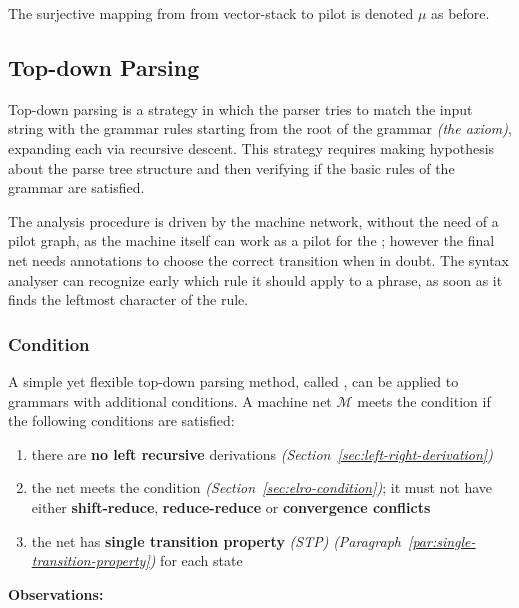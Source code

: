 \documentclass[english]{article}
\begin{document}
\bigskip
The surjective mapping from from vector-stack \mstates to pilot \mstates is denoted \(\mu\) as before.

\subsection{Top-down Parsing}
\label{sec:top-down}

Top-down parsing is a strategy in which the parser tries to match the input string with the grammar rules starting from the root of the grammar \textit{(the axiom)}, expanding each \RP via recursive descent.
This strategy requires making hypothesis about the parse tree structure and then verifying if the basic rules of the grammar are satisfied.

\bigskip
The analysis procedure is driven by the machine network, without the need of a pilot graph, as the machine itself can work as a pilot for the \PDA;
however the final net needs annotations to choose the correct transition when in doubt.
The syntax analyser can recognize early which rule it should apply to a phrase, as soon as it finds the leftmost character of the rule.

\subsubsection[ELL(1) Condition]{\ello Condition}

A simple yet flexible top-down parsing method, called \ello, can be applied to \elro grammars with additional conditions.
A machine net \(\mathcal{M}\) meets the \ello condition if the following conditions are satisfied:

\begin{enumerate}[label=\arabic*., ref=(\arabic*)]
  \item\label{enum:ell1-condition-1} there are \textbf{no left recursive} derivations \textit{(Section~\ref{sec:left-right-derivation})}
  \item\label{enum:ell1-condition-2} the net meets the \elro condition \textit{(Section~\ref{sec:elro-condition})}; it must not have either \textbf{shift-reduce}, \textbf{reduce-reduce} or \textbf{convergence conflicts}
  \item\label{enum:ell1-condition-3} the net has \textbf{single transition property} \textit{(STP)} \textit{(Paragraph~\ref{par:single-transition-property})} for each state
\end{enumerate}

\bigskip
\textbf{Observations:}
\end{document}
